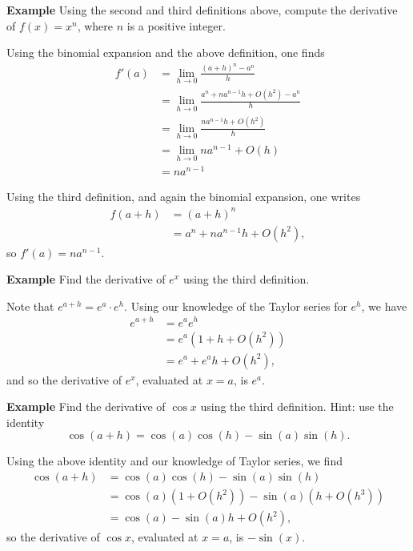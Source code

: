 \documentclass[twoside,openright,titlepage,a4paper]{book}
\begin{document}
\begin{sloppypar}
\textbf{Example} Using the second and third definitions above, compute the derivative of $f(x) = x^n$, where $n$ is a positive integer. 
\begin{examplebox}
Using the binomial expansion and the above definition, one finds
\begin{align*}
f'(a) &=\lim_{h \rightarrow 0} \frac{(a+h)^n-a^n}{h} \\
&= \lim_{h \rightarrow 0} \frac{a^n +n a^{n-1}h +O(h^2) - a^n}{h} \\
&= \lim_{h \rightarrow 0} \frac{n a^{n-1} h+ O(h^2)}{h} \\
&= \lim_{h \rightarrow 0} na^{n-1} + O(h) \\
&= na^{n-1}
\end{align*}

Using the third definition, and again the binomial expansion, one writes
\begin{align*}
f(a+h) &= (a+h)^n \\
&= a^n + na^{n-1}h + O(h^2),
\end{align*}
so $f'(a) = na^{n-1}$.
\end{examplebox}

\textbf{Example} Find the derivative of $e^x$ using the third definition.
\begin{examplebox}
Note that $e^{a+h} = e^a \cdot e^h$. Using our knowledge of the Taylor series for $e^h$, we have
\begin{align*} 
e^{a+h} &= e^ae^h \\
&= e^a \left(1+h + O(h^2)\right) \\
&= e^a + e^ah + O(h^2),
\end{align*}
and so the derivative of $e^x$, evaluated at $x=a$, is $e^a$.
\end{examplebox}

\textbf{Example} Find the derivative of $\cos x$ using the third definition. Hint: use the identity \[ \cos (a+h) = \cos (a) \cos (h) - \sin (a) \sin (h). \] 
\begin{examplebox}
Using the above identity and our knowledge of Taylor series, we find
\begin{align*}
\cos(a+h) &= \cos(a)\cos(h) - \sin(a)\sin(h) \\
&= \cos(a) \left(1 + O(h^2)\right) - \sin(a) \left(h + O(h^3)\right) \\
&= \cos(a) - \sin(a) h + O(h^2), 
\end{align*}
so the derivative of $\cos x$, evaluated at $x=a$, is $-\sin(x)$.
\end{examplebox}


\end{sloppypar}
\end{document}
